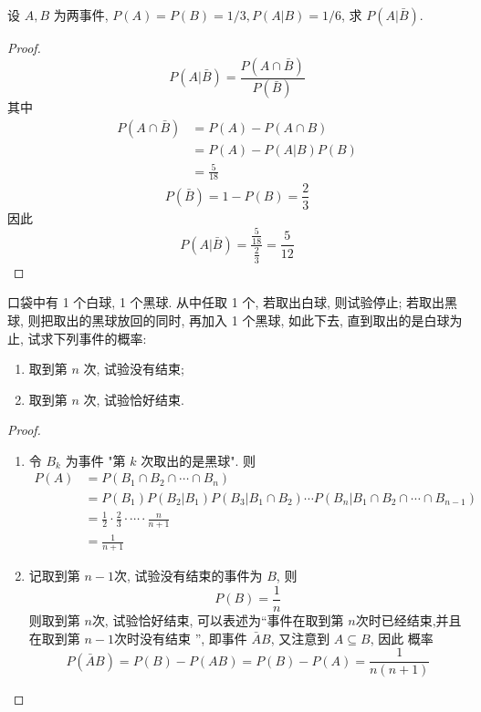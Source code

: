 \documentclass[../main.tex]{subfiles}
\begin{document}
\begin{exercise}{}{}
设 $A, B$ 为两事件, $P(A) = P(B) = 1/3, P(A|B) = 1/6$, 求 $P(A|\bar{B})$.
\end{exercise}

\begin{proof}
    \[
    P\left( A|\bar{B} \right)= \frac{P\left( A \cap \bar{B} \right)  }{P\left( \bar{B} \right)  }  
    \]其中 \[
   \begin{aligned}
    P\left( A\cap \bar{B} \right)&= P\left( A \right) -P\left( A\cap B \right)\\ 
     &= P\left( A \right) - P\left( A|B \right)P\left( B \right)\\ 
      &= \frac{5 }{18 }     
   \end{aligned}
    \] \[
    P\left( \bar{B} \right)= 1-P\left( B \right)= \frac{2 }{3 }   
    \]因此 \[
    P\left( A|\bar{B} \right)= \frac{\frac{5 }{18 }  }{\frac{2 }{3 }  }  = \frac{5 }{12 } 
    \]
\end{proof}
\begin{exercise}{}{}
口袋中有 1 个白球, 1 个黑球. 从中任取 1 个, 若取出白球, 则试验停止; 若取出黑球, 则把取出的黑球放回的同时, 再加入 1 个黑球, 如此下去, 直到取出的是白球为止, 试求下列事件的概率:
\begin{enumerate}
    \item 取到第 $n$ 次, 试验没有结束;
    \item 取到第 $n$ 次, 试验恰好结束.
\end{enumerate}
\end{exercise}

\begin{proof}
     \begin{enumerate}
        \item  令 $B_k$ 为事件 "第 $k$ 次取出的是黑球".   则 \[
   \begin{aligned}
        P(A)&= P\left( B_1\cap B_2\cap \cdots \cap B_{n} \right) \\ 
         & = P(B_1) P(B_2|B_1) P(B_3|B_1 \cap B_2) \cdots P(B_n|B_1 \cap B_2 \cap \cdots \cap B_{n-1})  \\ 
          &= \frac{1 }{2 }\cdot \frac{2 }{3 }\cdot \cdots \cdot \frac{n }{n+ 1 }\\ 
           &= \frac{1 }{n+ 1 }    
   \end{aligned}
        \] 
        \item 记取到第 \(  n-1  \)次, 试验没有结束的事件为 \(  B  \), 则 \[
        P\left( B \right)= \frac{1 }{n }  
        \]  则取到第 \(  n  \)次, 试验恰好结束, 可以表述为``事件在取到第 \(  n  \)次时已经结束,并且 在取到第 \(  n-1  \)次时没有结束  '', 即事件 \(  \bar{A}B \), 又注意到 \( A\subseteq B\), 因此 概率\[
        P\left( \bar{A}B \right)= P\left( B \right)-P\left( AB \right)= P\left( B \right)-P\left( A \right)= \frac{1 }{n\left( n+ 1 \right)  }      
        \]
     \end{enumerate}
     
\end{proof}
\end{document}
